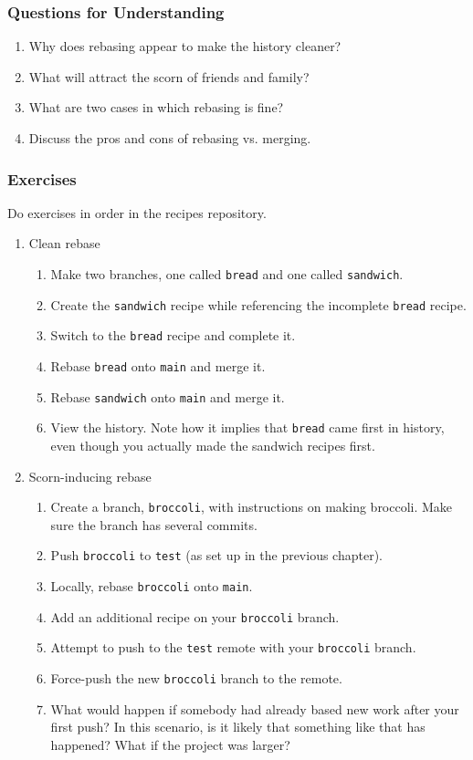 \subsubsection{Questions for Understanding}
\begin{enumerate}
	\item Why does rebasing appear to make the history cleaner?
	\item What will attract the scorn of friends and family?
	\item What are two cases in which rebasing is fine?
	\item Discuss the pros and cons of rebasing vs. merging.
\end{enumerate}

\subsubsection{Exercises}
Do exercises in order in the recipes repository.
\begin{enumerate}
	\item Clean rebase
	\begin{enumerate}
	   \item Make two branches, one called \verb`bread` and one called
	   \verb`sandwich`.
	   \item Create the \verb`sandwich` recipe while referencing the
	   incomplete \verb`bread`
		  recipe.
	   \item Switch to the \verb`bread` recipe and complete it.
	   \item Rebase \verb`bread` onto \verb`main` and merge it.
	   \item Rebase \verb`sandwich` onto \verb`main` and merge it.
	   \item View the history.
		  Note how it implies that \verb`bread` came first in history, even though
		  you actually made the sandwich recipes first.
	\end{enumerate}
	\item Scorn-inducing rebase
	\begin{enumerate}
	   \item Create a branch, \verb`broccoli`, with instructions on making broccoli.
		  Make sure the branch has several commits.
	   \item Push \verb`broccoli` to \verb`test` (as set up in the previous chapter).
	   \item Locally, rebase \verb`broccoli` onto \verb`main`.
	   \item Add an additional recipe on your \verb`broccoli` branch.
	   \item Attempt to push to the \verb`test` remote with your \verb`broccoli` branch.
	   \item Force-push the new \verb`broccoli` branch to the remote.
	   \item What would happen if somebody had already based new work after your
		  first push?
		  In this scenario, is it likely that something like that has happened?
		  What if the project was larger?
	\end{enumerate}
\end{enumerate}
